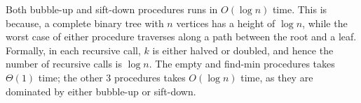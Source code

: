 \begin{minipage}{0.8\textwidth}
	\xxx
	\xxx
	\xxx
	\xxx
\end{minipage}

Both bubble-up and sift-down procedures runs in $O(\log n)$ time.
This is because, a complete binary tree with $n$ vertices has a height of $\log n$, while
the worst case of either procedure traverses along a path between the root and a leaf.
Formally, in each recursive call, $k$ is either halved or doubled, and hence the number
of recursive calls is $\log n$.
The empty and find-min procedures takes $\Theta(1)$ time; the other 3 procedures takes $O(\log n)$ time, as they are dominated by either bubble-up or sift-down.


